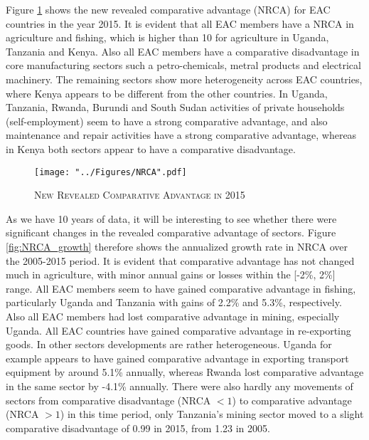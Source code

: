 \documentclass[a4paper]{article}
\begin{document}
Figure \ref{fig:NRCA} shows the new revealed comparative advantage (NRCA) for EAC countries in the year 2015. It is evident that all EAC members have a NRCA in agriculture and fishing, which is higher than 10 for agriculture in Uganda, Tanzania and Kenya. Also all EAC members have a comparative disadvantage in core manufacturing sectors such a petro-chemicals, metral products and electrical machinery. The remaining sectors show more heterogeneity across EAC countries, where Kenya appears to be different from the other countries. In Uganda, Tanzania, Rwanda, Burundi and South Sudan activities of private households (self-employment) seem to have a strong comparative advantage, and also maintenance and repair activities have a strong comparative advantage, whereas in Kenya both sectors appear to have a comparative disadvantage. \newline

\begin{figure}[h!]
\centering
\caption{\label{fig:NRCA}\textsc{New Revealed Comparative Advantage in 2015}}
\texttt{[image: "../Figures/NRCA".pdf]} %
\end{figure}
\FloatBarrier

As we have 10 years of data, it will be interesting to see whether there were significant changes in the revealed comparative advantage of sectors. Figure \ref{fig:NRCA_growth} therefore shows the annualized growth rate in NRCA over the 2005-2015 period. It is evident that comparative advantage has not changed much in agriculture, with minor annual gains or losses within the [-2\%, 2\%] range. All EAC members seem to have gained comparative advantage in fishing, particularly Uganda and Tanzania with gains of 2.2\% and 5.3\%, respectively. Also all EAC members had lost comparative advantage in mining, especially Uganda. All EAC countries have gained comparative advantage in re-exporting goods. In other sectors developments are rather heterogeneous. Uganda for example appears to have gained comparative advantage in exporting transport equipment by around 5.1\% annually, whereas Rwanda lost comparative advantage in the same sector by -4.1\% annually. There were also hardly any movements of sectors from comparative disadvantage (NRCA $< 1$) to comparative advantage (NRCA $> 1$) in this time period, only Tanzania's mining sector moved to a slight comparative disadvantage of 0.99 in 2015, from 1.23 in 2005. 

\end{document}
